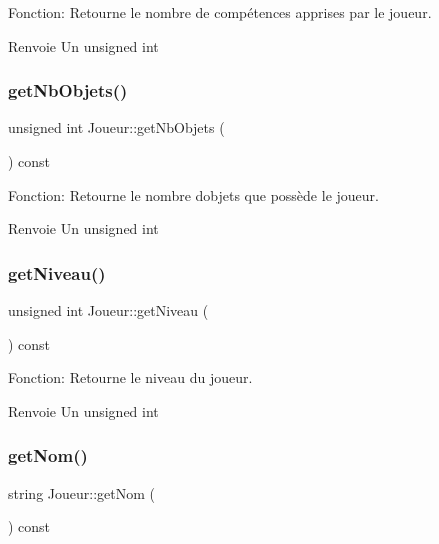 Fonction\+: Retourne le nombre de compétences apprises par le joueur. 

\begin{DoxyReturn}{Renvoie}
Un unsigned int 
\end{DoxyReturn}
\mbox{\label{classJoueur_a2e4f88f534715188f19d35d1f72c1a44}} 
\subsubsection{\texorpdfstring{get\+Nb\+Objets()}{getNbObjets()}}
{\footnotesize\ttfamily unsigned int Joueur\+::get\+Nb\+Objets (\begin{DoxyParamCaption}{ }\end{DoxyParamCaption}) const}



Fonction\+: Retourne le nombre d\textquotesingle{}objets que possède le joueur. 

\begin{DoxyReturn}{Renvoie}
Un unsigned int 
\end{DoxyReturn}
\mbox{\label{classJoueur_abec464c3958916f951e19ba5e12d0dbc}} 
\subsubsection{\texorpdfstring{get\+Niveau()}{getNiveau()}}
{\footnotesize\ttfamily unsigned int Joueur\+::get\+Niveau (\begin{DoxyParamCaption}{ }\end{DoxyParamCaption}) const}



Fonction\+: Retourne le niveau du joueur. 

\begin{DoxyReturn}{Renvoie}
Un unsigned int 
\end{DoxyReturn}
\mbox{\label{classJoueur_aa2ff1bfeeb5e1f631750d70c06b8c6d0}} 
\subsubsection{\texorpdfstring{get\+Nom()}{getNom()}}
{\footnotesize\ttfamily string Joueur\+::get\+Nom (\begin{DoxyParamCaption}{ }\end{DoxyParamCaption}) const}



